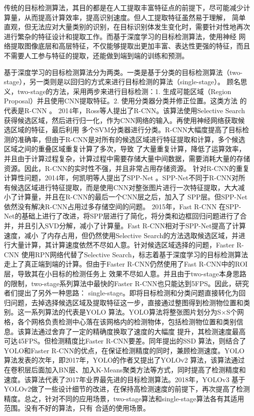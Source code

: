 传统的目标检测算法，其目的都是在人工提取丰富特征点的前提下，尽可能减少计算量，从而提高计算效率，提高识别速度。但人工提取特征虽然易于理解，
简单直观，但无法应对大量类别的识别，在目标识别体发生变化时，需要针对性地再次进行繁杂的特征设计和提取工作。而基于深度学习的目标检测算法，使用神经
网络提取图像底层和高层特征，不仅能够提取出更加丰富、表达性更强的特征，而且不需要人工参与特征的提取，还能做到端到端的训练和预测。

基于深度学习的目标检测算法分为两类。一类是基于分类的目标检测算法（two-stage），另一类则是以回归的方式来进行目标检测的算法（single-stage）。
顾名思义，two-stage的方法，采用两步来进行目标检测：1. 生成可能区域（Region Proposal）并且使用CNN提取特征。2. 使用分类器分类并修正位置。这类方法
的代表是R-CNN   \cite{RCNN:2014}。
2014年，Ross等人提出了R-CNN。该算法使用Selective Search获得候选区域，然后进行归一化，作为CNN网络的输入。再使用神经网络获取候选区域的特征，最后利用
多个SVM分类器进行分类。R-CNN大幅度提高了目标检测的准确率，但由于R-CNN是对所有的候选区域进行特征提取和计算，多个候选区域之间的重叠区域重复计算了多次，导致
了大量重复计算，降低了运算效率，并且由于计算过程复杂，计算过程中需要存储大量中间数据，需要消耗大量的存储资源。因此，R-CNN的实时性不强，并且非常占用存储资源。
针对R-CNN的重复计算性问题，2014年，何凯明等人提出了SPP-Net     \cite{SPP-NET:2014}
。SPP-Net不同于R-CNN对所有候选区域进行特征提取，而是使用CNN对整张图片进行一次特征提取，大大减小了计算量，并且在R-CNN的最后一个CNN层之后，加入了
SPP层。但SPP-Net依然没有解决R-CNN占用过多存储空间的问题。
2015年，Fast R-CNN  \cite{Fast-RCNN:2015}
在SPP-Net的基础上进行了改进，将SPP层进行了简化，将分类和边框回归问题进行了合并，并且引入SVD分解，减小了计算量。Fast R-CNN相对于SPP-Net提高了计算速度，减小
了内存占用，但仍然使用Selective Search的方法选取候选区域，并进行大量计算，其计算速度依然不尽如人意。针对候选区域选择的问题，Faster R-CNN    \cite{Faster-RCNN:2015}
使用RPN网络代替了Selective Search，标志着基于深度学习的目标检测算法走上了真正端到端的计算。但由于Faster R-CNN仍然使用了Fast R-CNN中的ROI层，导致其在小目标的检测任务上
效果不尽如人意。并且由于two-stage本身思路的限制，two-stage系列算法中最快的Faster R-CNN也只能达到5FPS。因此，研究者们提出了另外一种思路：
single-stage。即将目标检测和分类问题直接转化为回归问题，去掉选择候选区域及提取特征这一步，直接通过整图得到检测物位置和类别。这一系列算法的代表是YOLO    \cite{YOLO2016}
算法。YOLO算法将整张图片划分为S×S个网格，各个网格负责检测中心落在该网格内的检测物体，包括检测物位置和类别信息。该算法通过舍弃了一定的精确度换取了速度的大幅度
提升，其检测速度最高可达45FPS。但检测精度比Faster R-CNN要差。同年提出的SSD  \cite{SSD2016}
算法，则结合了YOLO和Faster R-CNN的优点，在保证检测精度的同时，兼顾检测速度。YOLO算法发表的次年，即2017年，YOLO的作者又提出了YOLOv2  \cite{YOLO9000:2017}
算法，该算法通过在卷积层后面加入BN层、加入K-Means聚类方法等方式，同时提高了检测精度和速度。该算法代表了2017年业界最先进的目标检测算法。2018年，YOLOv3   \cite{YOLOv3:2018}
基于YOLOv2做了一些设计细节的改进，在保持高检测速度的前提下，再次提高了检测精度。总之，针对不同的应用场景，two-stage算法和single-stage算法各有其适用范围。没有不好的算法，只有
合适的使用场景。


